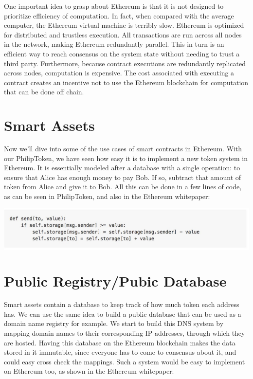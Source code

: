 \documentclass[full.tex]{subfiles}
\begin{document}
    One important idea to grasp about Ethereum is that it is not designed to prioritize efficiency of computation. In fact, when compared with the average computer, the Ethereum virtual machine is terribly slow. Ethereum is optimized for distributed and trustless execution. All transactions are run across all nodes in the network, making Ethereum redundantly parallel. This in turn is an efficient way to reach consensus on the system state without needing to trust a third party. Furthermore, because contract executions are redundantly replicated across nodes, computation is expensive. The cost associated with executing a contract creates an incentive not to use the Ethereum blockchain for computation that can be done off chain. 
    
    \section*{Smart Assets}
    
    Now we'll dive into some of the use cases of smart contracts in Ethereum. With our PhilipToken, we have seen how easy it is to implement a new token system in Ethereum. It is essentially modeled after a database with a single operation: to ensure that Alice has enough money to pay Bob. If so, subtract that amount of token from Alice and give it to Bob. All this can be done in a few lines of code, as can be seen in PhilipToken, and also in the Ethereum whitepaper:
    
    \begin{center}
        \includegraphics[scale=0.5]{smart_assets}
    \end{center}
    
    \section*{Public Registry/Pubic Database}
    
    Smart assets contain a database to keep track of how much token each address has. We can use the same idea to build a public database that can be used as a domain name registry for example. We start to build this DNS system by mapping domain names to their corresponding IP addresses, through which they are hosted. Having this database on the Ethereum blockchain makes the data stored in it immutable, since everyone has to come to consensus about it, and could easy cross check the mappings. Such a system would be easy to implement on Ethereum too, as shown in the Ethereum whitepaper:
    
\end{document}
